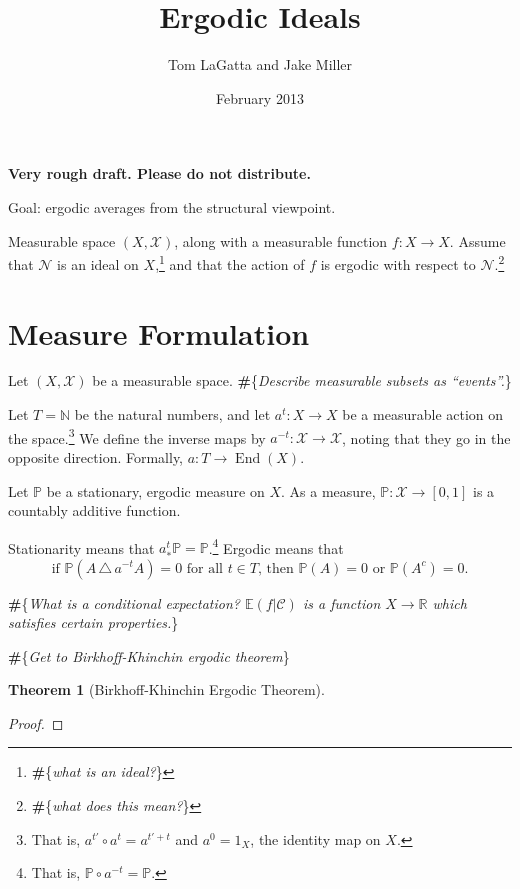 \documentclass[letterpaper,10pt,oneside,onecolumn,reqno]{amsart}
\author{Tom LaGatta and Jake Miller}
\title{Ergodic Ideals}
\date{February 2013}
\newcommand{\C}{\mathcal C}
\newcommand{\E}{\mathbb E}
\newcommand{\N}{\mathcal N}
\newcommand{\NN}{\mathbb N}
\renewcommand{\P}{\mathbb P}
\newcommand{\R}{\mathbb R}
\newcommand{\X}{\mathcal X}
\renewcommand{\d}{\mathrm{d}}				%
\theoremstyle{definition}
\newtheorem{thm}{Theorem}
\newcommand{\End}{\operatorname{End}}
\newcommand{\tom}[1]{{\textbf{\color{ForestGreen}\#}{\color{ForestGreen}\{\emph{#1}\}}}}
\begin{document}
\maketitle

	\textbf{Very rough draft. Please do not distribute.}

	Goal: ergodic averages from the structural viewpoint. 

	Measurable space $(X, \X)$, along with a measurable function $f : X \to X$. Assume that $\N$ is an ideal on $X$,\footnote{\tom{what is an ideal?}} and that the action of $f$ is ergodic with respect to $\N$.\footnote{\tom{what does this mean?}}
	
	
	

	\section{Measure Formulation}

	Let $(X,\X)$ be a measurable space. \tom{Describe measurable subsets as ``events''.}
	
	Let $T = \NN$ be the natural numbers, and let $a^t : X \to X$ be a measurable action on the space.\footnote{That is, $a^{t'} \circ a^t = a^{t' + t}$ and $a^{0} = 1_X$, the identity map on $X$.} We define the inverse maps by $a^{-t} : \X \to \X$, noting that they go in the opposite direction. Formally, $a : T \to \End(X)$.
	
	
	
	Let $\P$ be a stationary, ergodic measure on $X$. As a measure, $\P : \X \to [0,1]$ is a countably additive function.
	
	Stationarity means that $a^t_* \P = \P$.\footnote{That is, $\P \circ a^{-t} = \P$.} Ergodic means that
		$$\mbox{if $\P( A \,\triangle\, a^{-t} A ) = 0$ for all $t \in T$, then $\P(A) = 0$ or $\P(A^c) = 0$.}$$

	\tom{What is a conditional expectation? $\E(f|\C)$ is a function $X \to \R$ which satisfies certain properties.} 
	
	
	

	\tom{Get to Birkhoff-Khinchin ergodic theorem}
	
		\begin{thm}[Birkhoff-Khinchin Ergodic Theorem]
			
		\end{thm}
		\begin{proof}
			
		\end{proof}
		
\end{document}
